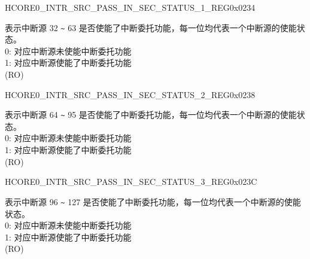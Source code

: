 \begin{register}{H}{CORE0\_INTR\_SRC\_PASS\_IN\_SEC\_STATUS\_1\_REG}{0x0234}\label{regdesc:CORE0INTRSRCPASSINSECSTATUS1REG}
%
\regnewline%
\begin{regdesc}\begin{reglist}
\label{fielddesc:CORE0INTRSRCPASSINSECSTATUS1}\item [CORE0\_INTR\_SRC\_PASS\_IN\_SEC\_STATUS\_1] 表示中断源 32 \verb+~+ 63 是否使能了中断委托功能，每一位均代表一个中断源的使能状态。\\
0: 对应中断源未使能中断委托功能\\
1: 对应中断源使能了中断委托功能\\
(RO)
\end{reglist}\end{regdesc}
\end{register}

\begin{register}{H}{CORE0\_INTR\_SRC\_PASS\_IN\_SEC\_STATUS\_2\_REG}{0x0238}\label{regdesc:CORE0INTRSRCPASSINSECSTATUS2REG}
%
\regnewline%
\begin{regdesc}\begin{reglist}
\label{fielddesc:CORE0INTRSRCPASSINSECSTATUS2}\item [CORE0\_INTR\_SRC\_PASS\_IN\_SEC\_STATUS\_2] 表示中断源 64 \verb+~+ 95 是否使能了中断委托功能，每一位均代表一个中断源的使能状态。\\
0: 对应中断源未使能中断委托功能\\
1: 对应中断源使能了中断委托功能\\
(RO)
\end{reglist}\end{regdesc}
\end{register}

\begin{register}{H}{CORE0\_INTR\_SRC\_PASS\_IN\_SEC\_STATUS\_3\_REG}{0x023C}\label{regdesc:CORE0INTRSRCPASSINSECSTATUS3REG}
%
\regnewline%
\begin{regdesc}\begin{reglist}
\label{fielddesc:CORE0INTRSRCPASSINSECSTATUS3}\item [CORE0\_INTR\_SRC\_PASS\_IN\_SEC\_STATUS\_3] 表示中断源 96 \verb+~+ 127 是否使能了中断委托功能，每一位均代表一个中断源的使能状态。\\
0: 对应中断源未使能中断委托功能\\
1: 对应中断源使能了中断委托功能\\
(RO)
\end{reglist}\end{regdesc}
\end{register}

